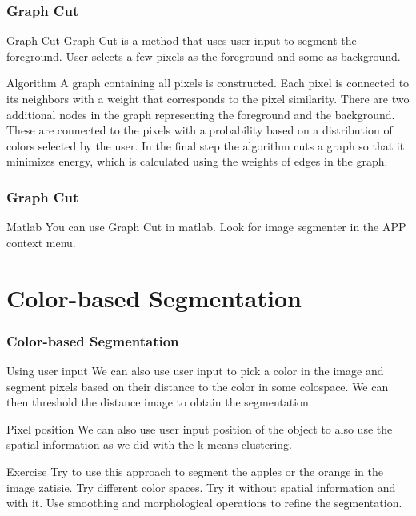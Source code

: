 \documentclass{beamer}
\begin{document}
\begin{frame}
\frametitle{Graph Cut}
\begin{block}{Graph Cut}
Graph Cut is a method that uses user input to segment the foreground. User selects a few pixels as the foreground and some as background.
\end{block}

\begin{block}{Algorithm}
A graph containing all pixels is constructed. Each pixel is connected to its neighbors with a weight that corresponds to the pixel similarity. There are two additional nodes in the graph representing the foreground and the background. These are connected to the pixels with a probability based on a distribution of colors selected by the user. In the final step the algorithm cuts a graph so that it minimizes energy, which is calculated using the weights of edges in the graph.
\end{block}

\end{frame}

\begin{frame}
\frametitle{Graph Cut}
\begin{block}{Matlab}
You can use Graph Cut in matlab. Look for image segmenter in the APP context menu.
\end{block}
\end{frame}

\section{Color-based Segmentation}

\begin{frame}
\frametitle{Color-based Segmentation}
\begin{block}{Using user input}
We can also use user input to pick a color in the image and segment pixels based on their distance to the color in some colospace. We can then threshold the distance image to obtain the segmentation.
\end{block}

\begin{block}{Pixel position}
We can also use user input position of the object to also use the spatial information as we did with the k-means clustering.
\end{block}

\begin{block}{Exercise}
Try to use this approach to segment the apples or the orange in the image zatisie. Try different color spaces. Try it without spatial information and with it. Use smoothing and morphological operations to refine the segmentation. 
\end{block}
\end{frame}
\end{document}
